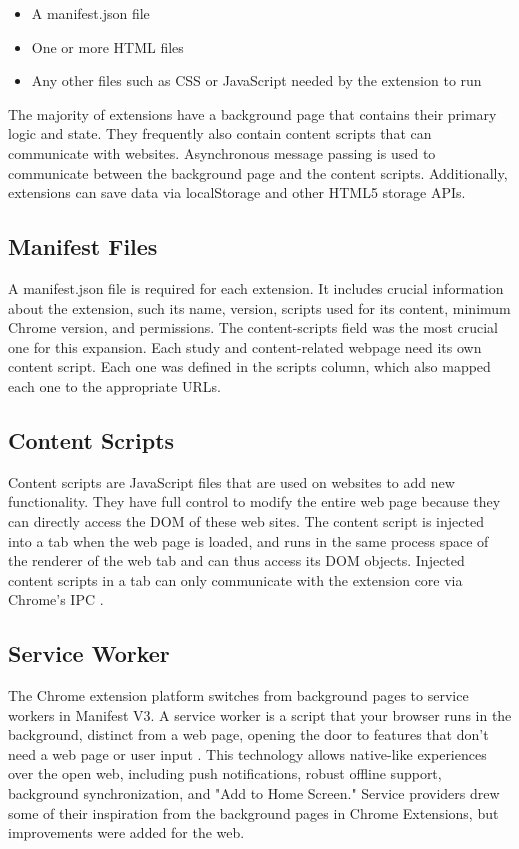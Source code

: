 \begin{itemize}
  \item A manifest.json file
  \item One or more HTML files
  \item Any other files such as CSS or JavaScript needed by the extension to run
\end{itemize}

The majority of extensions have a background page that contains their primary logic and state. They frequently also contain content scripts that can communicate with websites. Asynchronous message passing is used to communicate between the background page and the content scripts. Additionally, extensions can save data via localStorage and other HTML5 storage APIs.

\subsection{Manifest Files}
A manifest.json file is required for each extension. It includes crucial information about the extension, such its name, version, scripts used for its content, minimum Chrome version, and permissions. The content-scripts field was the most crucial one for this expansion. Each study and content-related webpage need its own content script. Each one was defined in the scripts column, which also mapped each one to the appropriate URLs.

\subsection{Content Scripts}
Content scripts are JavaScript files that are used on websites to add new functionality. They have full control to modify the entire web page because they can directly access the DOM of these web sites. The content script is injected into a tab when the web page is loaded, and runs in the same process space of the renderer of the web tab and can thus access its DOM objects. Injected content scripts in a tab can only communicate with the extension core via Chrome's IPC \autocite{liu2012chrome}.

\subsection{Service Worker}
The Chrome extension platform switches from background pages to service workers in Manifest V3. A service worker is a script that your browser runs in the background, distinct from a web page, opening the door to features that don't need a web page or user input \autocite{chrome2021service}. This technology allows native-like experiences over the open web, including push notifications, robust offline support, background synchronization, and "Add to Home Screen." Service providers drew some of their inspiration from the background pages in Chrome Extensions, but improvements were added for the web.

